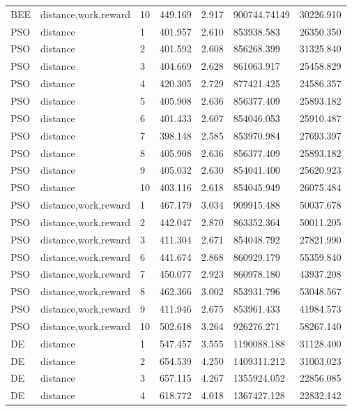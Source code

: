 \documentclass{tamuccthesis}
\begin{document}
\begin{appendices}
\begin{small}
\begin{longtable}{lllllll}
BEE & distance,work,reward & 10  & 449.169 & 2.917 & 900744.74149  & 30226.910 \\
PSO & distance    & 1   & 401.957 & 2.610  & 853938.583 & 26350.350 \\
PSO & distance    & 2   & 401.592  & 2.608 & 856268.399 & 31325.840 \\
PSO & distance    & 3   & 404.669 & 2.628 & 861063.917 & 25458.829 \\
PSO & distance    & 4   & 420.305  & 2.729 & 877421.425 & 24586.357 \\
PSO & distance    & 5   & 405.908 & 2.636 & 856377.409 & 25893.182 \\
PSO & distance    & 6   & 401.433 & 2.607 & 854046.053 & 25910.487  \\
PSO & distance    & 7   & 398.148 & 2.585 & 853970.984 & 27693.397 \\
PSO & distance    & 8   & 405.908 & 2.636 & 856377.409 & 25893.182 \\
PSO & distance    & 9   & 405.032 & 2.630 & 854041.400  & 25620.923 \\
PSO & distance    & 10  & 403.116 & 2.618 & 854045.949 & 26075.484 \\
PSO & distance,work,reward    & 1   & 467.179 & 3.034 & 909915.488 & 50037.678 \\
PSO & distance,work,reward    & 2   & 442.047 & 2.870 & 863352.364 & 50011.205 \\
PSO & distance,work,reward    & 3   & 411.304 & 2.671 & 854048.792 & 27821.990 \\
PSO & distance,work,reward    & 6   & 441.674 & 2.868 & 860929.179 & 55359.840 \\
PSO & distance,work,reward    & 7   & 450.077 & 2.923 & 860978.180 & 43937.208 \\
PSO & distance,work,reward    & 8   & 462.366 & 3.002 & 853931.796 & 53048.567 \\
PSO & distance,work,reward    & 9   & 411.946 & 2.675 & 853961.433 & 41984.573 \\
PSO & distance,work,reward    & 10  & 502.618 & 3.264 & 926276.271 & 58267.140 \\
DE  & distance    & 1   & 547.457 & 3.555 & 1190088.188 & 31128.400 \\
DE  & distance    & 2   & 654.539 & 4.250 & 1409311.212 & 31003.023 \\
DE  & distance    & 3   & 657.115 & 4.267 & 1355924.052 & 22856.085 \\
DE  & distance    & 4   & 618.772 & 4.018 & 1367427.128 & 22832.142 \\

\end{longtable}
\end{small}
\end{appendices}
\end{document}
